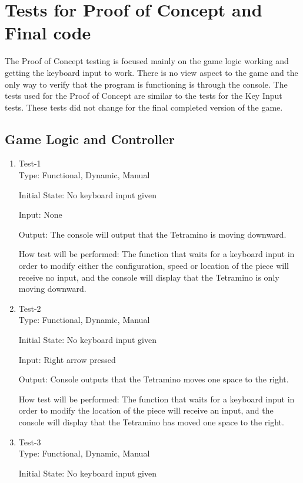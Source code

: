 \documentclass[12pt, titlepage]{article}
\begin{document}
\section{Tests for Proof of Concept and Final code}
The Proof of Concept testing is focused mainly on the game logic working and getting the keyboard input to work. There is no view aspect to the game and the only way to verify that the program is functioning is through the console. The tests used for the Proof of Concept are similar to the tests for the Key Input tests. These tests did not change for the final completed version of the game.
\subsection{Game Logic and Controller}

\begin{enumerate}
\item{Test-1\\}
Type: Functional, Dynamic, Manual
					
Initial State: No keyboard input given
					
Input: None
					
Output: The console will output that the Tetramino is moving downward.
					
How test will be performed: The function that waits for a keyboard input in order to modify either the configuration, speed or location of the piece will receive no input, and the console will display that the Tetramino is only moving downward.
					
\item{Test-2\\}
Type: Functional, Dynamic, Manual
					
Initial State: No keyboard input given
					
Input: Right arrow pressed
					
Output: Console outputs that the Tetramino moves one space to the right.
					
How test will be performed: The function that waits for a keyboard input in order to modify the location of the piece will receive an input, and the console will display that the Tetramino has moved one space to the right.

\item{Test-3\\}
Type: Functional, Dynamic, Manual
					
Initial State: No keyboard input given
					

\end{enumerate}
\end{document}
